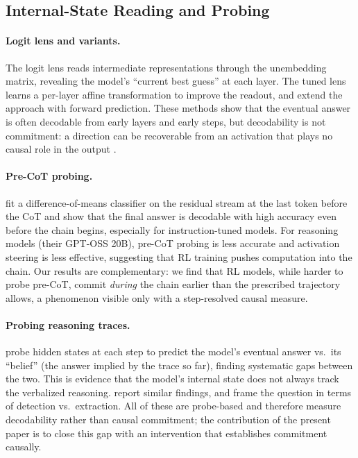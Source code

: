 \documentclass[11pt]{article}
\begin{document}
\subsection{Internal-State Reading and Probing}
\label{app:related-probing}

\paragraph{Logit lens and variants.}
The logit lens \citep{nostalgebraist2020logitlens} reads intermediate
representations through the unembedding matrix, revealing the model's
``current best guess'' at each layer. The tuned lens
\citep{DBLP:journals/corr/abs-2303-08112} learns a per-layer affine
transformation to improve the readout, and
\citet{DBLP:conf/conll/PalSYWB23} extend the approach with forward prediction.
These methods show that the eventual answer is often decodable from early layers
and early steps, but decodability is not commitment: a direction can be
recoverable from an activation that plays no causal role in the output
\citep{DBLP:conf/nips/VigGBQNSS20,DBLP:conf/nips/GeigerLIP21}.

\paragraph{Pre-CoT probing.}
\citet{DBLP:journals/corr/abs-2603-01437} fit a difference-of-means classifier
on the residual stream at the last token before the CoT and show
that the final answer is decodable with high accuracy even before the chain
begins, especially for instruction-tuned models. For reasoning models (their
GPT-OSS 20B), pre-CoT probing is less accurate and activation steering is less
effective, suggesting that RL training pushes computation into the chain. Our
results are complementary: we find that RL models, while harder to probe
pre-CoT, commit \emph{during} the chain earlier than the prescribed trajectory
allows, a phenomenon visible only with a step-resolved causal measure.

\paragraph{Probing reasoning traces.}
\citet{DBLP:journals/corr/abs-2603-05488} probe hidden states at each step to
predict the model's eventual answer vs.\ its ``belief'' (the answer implied by
the trace so far), finding systematic gaps between the two. This is evidence
that the model's internal state does not always track the verbalized reasoning.
\citet{DBLP:journals/corr/abs-2511-14773} report similar findings, and
\citet{DBLP:journals/corr/abs-2604-06613} frame the question in terms of
detection vs.\ extraction. All of these are probe-based and therefore measure
decodability rather than causal commitment; the contribution of the present paper
is to close this gap with an intervention that establishes commitment causally.
\end{document}
